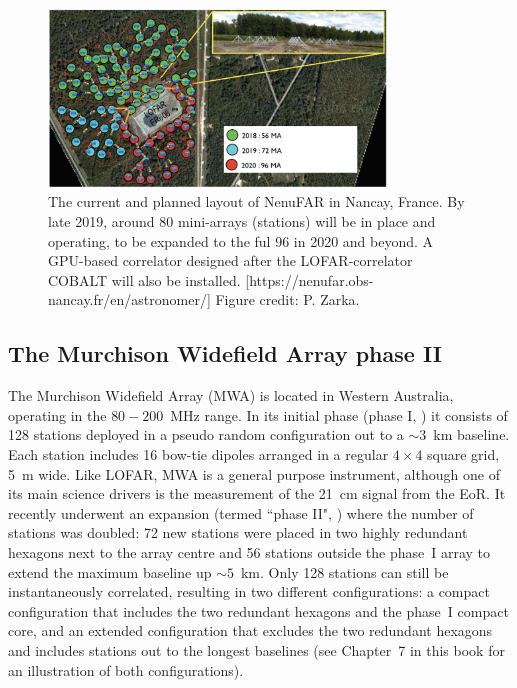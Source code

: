 \begin{figure}[]
\begin{center}
\includegraphics[width=0.8\textwidth]{Koopmans_Bernardi/NenuFAR.png}
\end{center}
\caption{The current and planned layout of NenuFAR in Nancay, France. By late 2019, around 80 mini-arrays (stations) will be in place and operating, to be expanded to the ful 96 in 2020 and beyond. A GPU-based correlator designed after the LOFAR-correlator COBALT will also be installed. [https://nenufar.obs-nancay.fr/en/astronomer/] Figure credit: P. Zarka.}
\label{fig:fig_NenuFAR}
\end{figure}

\subsection{The Murchison Widefield Array phase II}

The Murchison Widefield Array (MWA) is located in Western Australia, operating in the $80-200$~MHz range. In its initial phase (phase I, \cite{tingay13}) it consists of 128 stations deployed in a pseudo random configuration out to a $\sim 3$~km baseline. Each station includes 16 bow-tie dipoles arranged in a regular $4 \times 4$ square grid, 5~m wide. Like LOFAR, MWA is a general purpose instrument, although one of its main science drivers is the measurement of the 21~cm signal from the EoR. It recently underwent an expansion (termed ``phase II", \cite{wayth18}) where the number of stations was doubled: 72 new stations were placed in two highly redundant hexagons next to the array centre and 56 stations outside the phase~I array to extend the maximum baseline up $\sim 5$~km. Only 128 stations can still be instantaneously correlated, resulting in two different configurations: a compact configuration that includes the two redundant hexagons and the phase~I compact core, and an extended configuration that excludes the two redundant hexagons and includes stations out to the longest baselines (see Chapter~7 in this book for an illustration of both configurations).

